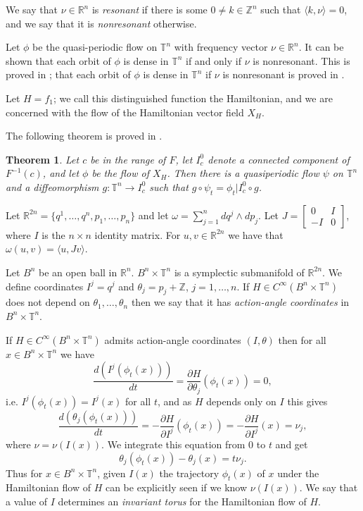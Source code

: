 \documentclass{article}
\newtheorem{theorem}{Theorem}
\begin{document}
We say that
$\nu \in \mathbb{R}^n$ is {\em resonant} if there is some $0 \neq k \in \mathbb{Z}^n$ such that $\langle k,\nu \rangle=0$, and we say that it is {\em nonresonant} otherwise.

Let $\phi$ be the quasi-periodic flow on $\mathbb{T}^n$ with frequency vector $\nu \in \mathbb{R}^n$.
It can be shown that each orbit of $\phi$ is dense in $\mathbb{T}^n$ if and only
if $\nu$ is nonresonant. This is proved in \cite[pp. 818--820]{foundations}; that each orbit of $\phi$ is dense in $\mathbb{T}^n$ if $\nu$ is nonresonant is proved in \cite[Theorem 444]{MR2445243}.

Let $H=f_1$; we call this distinguished function the Hamiltonian, and we are
concerned with the flow of the Hamiltonian vector field $X_H$.

The following theorem is proved in \cite[Theorem 5.2.24]{foundations}. 

\begin{theorem}
Let $c$ be in the range of $F$, let $I_c^0$ denote a connected component
of $F^{-1}(c)$, and let $\phi$ be the flow of $X_H$. Then there is a quasiperiodic flow $\psi$ on $\mathbb{T}^n$ and a diffeomorphism $g:\mathbb{T}^n \to I_c^0$ such that $g \circ \psi_t=\phi_t|I_c^0 \circ g$.
\end{theorem}

Let $\mathbb{R}^{2n}=\{q^1,\ldots,q^n,p_1,\ldots,p_n\}$ and let
$\omega=\sum_{j=1}^n dq^j \wedge dp_j$.
Let $J=\begin{bmatrix}0&I\\-I&0\end{bmatrix}$, where $I$ is the $n \times n$
identity matrix. For $u,v \in \mathbb{R}^{2n}$ we have that $\omega(u,v)=\langle u,Jv \rangle$. 

Let $B^n$ be an open ball in $\mathbb{R}^n$. $B^n \times \mathbb{T}^n$
is a symplectic submanifold of $\mathbb{R}^{2n}$. We define coordinates
$I^j=q^j$ and $\theta_j=p_j+\mathbb{Z}$, $j=1,\ldots,n$.
If $H \in C^\infty(B^n \times \mathbb{T}^n)$ does not depend on $\theta_1,\ldots,\theta_n$ then we say that it has {\em action-angle coordinates}
in $B^n \times \mathbb{T}^n$.

If $H \in C^\infty(B^n \times \mathbb{T}^n)$ admits action-angle coordinates
$(I,\theta)$ then for all $x \in B^n \times \mathbb{T}^n$ we have
\[
\frac{d(I^j(\phi_t(x)))}{dt}=\frac{\partial H}{\partial \theta_j}(\phi_t(x))=0,
\]
i.e. $I^j(\phi_t(x))=I^j(x)$ for all $t$, and as $H$ depends only
on $I$ this gives
\[
\frac{d(\theta_j(\phi_t(x)))}{dt}=-\frac{\partial H}{\partial I^j}(\phi_t(x))=
-\frac{\partial H}{\partial I^j}(x)=\nu_j,
\]
where $\nu=\nu(I(x))$.
We integrate this equation from $0$ to $t$ and get
\[
\theta_j(\phi_t(x))-\theta_j(x)=t\nu_j.
\]
Thus for $x \in B^n \times \mathbb{T}^n$, given
$I(x)$ the trajectory $\phi_t(x)$ of $x$ under the Hamiltonian flow of $H$ 
can be explicitly seen if we know $\nu(I(x))$.
We say that a value of $I$ determines an {\em invariant torus} for the Hamiltonian flow of $H$.
\end{document}
